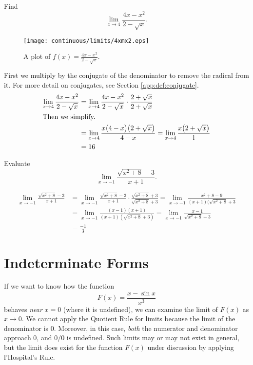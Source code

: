 \begin{ex}
  Find
  \[ \lim_{x \to 4} \frac{4x-x^2}{2-\sqrt x} \text{.} \]
  \begin{sol}
    \begin{figure}[h]
      \begin{center}
        \texttt{[image: continuous/limits/4xmx2.eps]}
      \end{center}
      \caption{A plot of $f(x)= \frac{4x-x^2}{2-\sqrt x}$.}
    \end{figure}
    First we multiply by the conjugate of the denominator to remove the radical from it. For more detail on conjugates, see Section \ref{app:def:conjugate}.
    \begin{align*}
      \lim_{x \to 4} \frac{4x-x^2}{2-\sqrt x}
      &= \lim_{x \to 4} \frac{4x-x^2}{2-\sqrt x} \cdot \frac{2+\sqrt x}{2+\sqrt x}\\
      \intertext{Then we simplify.}
      &=\lim_{x \to 4} \frac{x\big(4-x\big)\big(2+\sqrt{x}\big)}{4-x}
       = \lim_{x \to 4} \frac{x\big(2+\sqrt{x}\big)}{1} \\
      &= 16
    \end{align*}
  \end{sol}
\end{ex}
\begin{ex}
  Evaluate
  \[ \lim_{x \to -1} \frac{\sqrt{x^2+8}-3}{x+1} \text{.} \]
  \begin{sol}
    \begin{align*}
      \lim_{x \to -1} \frac{\sqrt{x^2+8}-3}{x+1}
      &= \lim_{x \to -1} \frac{\sqrt{x^2+8}-3}{x+1} \cdot \frac{\sqrt{x^2+8}+3}{\sqrt{x^2+8}+3}
      = \lim_{x \to -1} \frac{x^2+8-9}{(x+1)(\sqrt{x^2+8}+3} \\
      &= \lim_{x \to -1} \frac{(x-1)(x+1)}{(x+1)(\sqrt{x^2+8}+3)}
      = \lim_{x \to -1} \frac{x-1}{\sqrt{x^2+8}+3} \\
      &= \frac{-1}{3}
    \end{align*}
  \end{sol}
\end{ex}


\section{Indeterminate Forms}

If we want to know how the function
$$F(x)=\frac{x-\sin x}{x^3}$$
behaves \emph{near} $x=0$ (where it is undefined), we can examine the limit of $F(x)$ as $x \to 0$. We cannot apply the Quotient Rule for limits because the limit of the denominator is $0$. Moreover, in this case, \emph{both} the numerator and denominator approach $0$, and $0/0$ is undefined. Such limits may or may not exist in general, but the limit does exist for the function $F(x)$ under discussion by applying l'Hospital's Rule.

